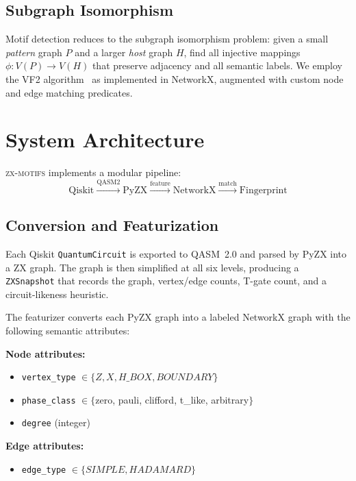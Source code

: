 \documentclass[twocolumn,prl,amsmath,amssymb,superscriptaddress]{revtex4-2}
\newcommand{\zxmotifs}{\textsc{zx-motifs}}
\begin{document}
\subsection{Subgraph Isomorphism}

Motif detection reduces to the subgraph isomorphism problem: given a small \emph{pattern} graph $P$ and a larger \emph{host} graph $H$, find all injective mappings $\phi: V(P) \to V(H)$ that preserve adjacency and all semantic labels.
We employ the VF2 algorithm~\cite{Cordella2004} as implemented in NetworkX, augmented with custom node and edge matching predicates.

\section{System Architecture}
\label{sec:architecture}

\zxmotifs{} implements a modular pipeline:
\begin{equation*}
    \text{Qiskit} \xrightarrow{\text{QASM2}} \text{PyZX} \xrightarrow{\text{feature}} \text{NetworkX} \xrightarrow{\text{match}} \text{Fingerprint}
\end{equation*}

\subsection{Conversion and Featurization}

Each Qiskit \texttt{QuantumCircuit} is exported to QASM~2.0 and parsed by PyZX into a ZX graph.
The graph is then simplified at all six levels, producing a \texttt{ZXSnapshot} that records the graph, vertex/edge counts, T-gate count, and a circuit-likeness heuristic.

The featurizer converts each PyZX graph into a labeled NetworkX graph with the following semantic attributes:

\textbf{Node attributes:}
\begin{itemize}
    \item \texttt{vertex\_type} $\in \{Z, X, H\_BOX, BOUNDARY\}$
    \item \texttt{phase\_class} $\in \{$zero, pauli, clifford, t\_like, arbitrary$\}$
    \item \texttt{degree} (integer)
\end{itemize}

\textbf{Edge attributes:}
\begin{itemize}
    \item \texttt{edge\_type} $\in \{SIMPLE, HADAMARD\}$
\end{itemize}
\end{document}
